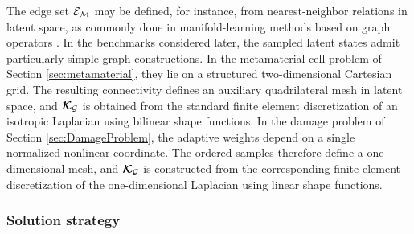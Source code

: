 \documentclass[preprint,10pt]{elsarticle}  %
\newcommand{\PROMPT}[1]{ }
\begin{document}


  The edge set \(\mathcal{E}_{\mathcal{M}}\) may be defined, for
instance, from nearest-neighbor relations in latent space, as commonly
done in manifold-learning methods based on graph operators \cite{belkin2003laplacian}.
In the benchmarks
considered later, the sampled latent states admit particularly simple
graph constructions. In the metamaterial-cell problem of Section \ref{sec:metamaterial}, they lie on a
structured two-dimensional Cartesian grid. The resulting connectivity
defines an auxiliary quadrilateral mesh in latent space, and
\(\boldsymbol{\mathcal{K}}_{\mathcal{G}}\) is obtained from the standard finite element discretization
of an isotropic Laplacian using bilinear shape functions. In the
damage problem of Section \ref{sec:DamageProblem}, the adaptive weights depend on a single normalized
nonlinear coordinate. The ordered samples therefore define a
one-dimensional mesh, and \(\boldsymbol{\mathcal{K}}_{\mathcal{G}}\) is constructed from the
corresponding finite element discretization of the one-dimensional
Laplacian using linear shape functions.









 \subsubsection{Solution strategy}
\label{sec:stagegraph}




\end{document}
